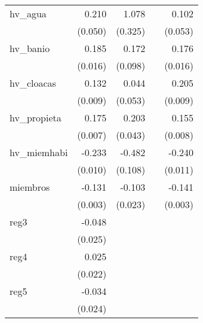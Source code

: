 {\begin{longtable}{l*{4}{D{.}{.}{-1}}}
\addlinespace
hv\_agua     &       0.210\sym{***}&       1.078\sym{***}&                     &       0.102         \\
            &     (0.050)         &     (0.325)         &                     &     (0.053)         \\
\addlinespace
hv\_banio    &       0.185\sym{***}&       0.172         &                     &       0.176\sym{***}\\
            &     (0.016)         &     (0.098)         &                     &     (0.016)         \\
\addlinespace
hv\_cloacas  &       0.132\sym{***}&       0.044         &                     &       0.205\sym{***}\\
            &     (0.009)         &     (0.053)         &                     &     (0.009)         \\
\addlinespace
hv\_propieta &       0.175\sym{***}&       0.203\sym{***}&                     &       0.155\sym{***}\\
            &     (0.007)         &     (0.043)         &                     &     (0.008)         \\
\addlinespace
hv\_miemhabi &      -0.233\sym{***}&      -0.482\sym{***}&                     &      -0.240\sym{***}\\
            &     (0.010)         &     (0.108)         &                     &     (0.011)         \\
\addlinespace
miembros    &      -0.131\sym{***}&      -0.103\sym{***}&                     &      -0.141\sym{***}\\
            &     (0.003)         &     (0.023)         &                     &     (0.003)         \\
\addlinespace
reg3        &      -0.048         &                     &                     &                     \\
            &     (0.025)         &                     &                     &                     \\
\addlinespace
reg4        &       0.025         &                     &                     &                     \\
            &     (0.022)         &                     &                     &                     \\
\addlinespace
reg5        &      -0.034         &                     &                     &                     \\
            &     (0.024)         &                     &                     &                     \\

\end{longtable}}
